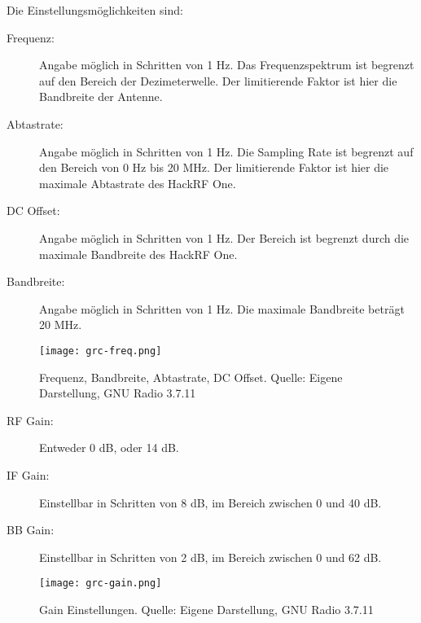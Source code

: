 Die Einstellungsmöglichkeiten sind:

\begin{description}
	\item [Frequenz:] Angabe möglich in Schritten von 1 Hz. Das Frequenzspektrum ist begrenzt auf den Bereich der Dezimeterwelle. Der limitierende Faktor ist hier die Bandbreite der Antenne.
	\item [Abtastrate:] Angabe möglich in Schritten von 1 Hz. Die Sampling Rate ist begrenzt auf den Bereich von 0 Hz bis 20 MHz. Der limitierende Faktor ist hier die maximale Abtastrate des HackRF One.
	\item [DC Offset:]  Angabe möglich in Schritten von 1 Hz. Der Bereich ist begrenzt durch die maximale Bandbreite des HackRF One.
	\item[Bandbreite:] Angabe möglich in Schritten von 1 Hz. Die maximale Bandbreite beträgt 20 MHz. 
\end{description}

\begin{figure}[ht]
	\centering
	\texttt{[image: grc-freq.png]}
	\caption[Frequenz, Bandbreite, Abtastrate, DC Offset]{Frequenz, Bandbreite, Abtastrate, DC Offset. Quelle: Eigene Darstellung, GNU Radio 3.7.11} 
	\label{grc-freq}
\end{figure}

\newpage
\begin{description}
	\item[RF Gain:] Entweder 0 dB, oder 14 dB. 
	\item[IF Gain:] Einstellbar in Schritten von 8 dB, im Bereich zwischen 0 und 40 dB.
	\item[BB Gain:] Einstellbar in Schritten von 2 dB, im Bereich zwischen 0 und 62 dB.
\end{description}

\begin{figure}[ht]
	\centering
	\texttt{[image: grc-gain.png]}
	\caption[Gain Einstellungen]{Gain Einstellungen. Quelle: Eigene Darstellung, GNU Radio 3.7.11} 
	\label{grc-gain}
\end{figure}

